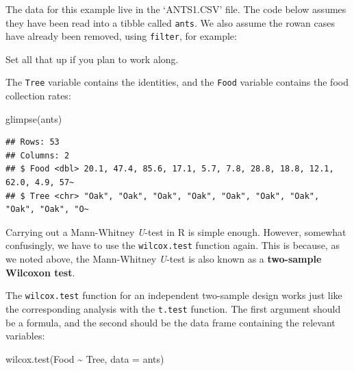\documentclass[
]{book}
\newenvironment{Shaded}{\begin{snugshade}}{\end{snugshade}}
\newcommand{\AttributeTok}[1]{\textcolor[rgb]{0.77,0.63,0.00}{#1}}
\newcommand{\FunctionTok}[1]{\textcolor[rgb]{0.00,0.00,0.00}{#1}}
\newcommand{\NormalTok}[1]{#1}
\newcommand{\SpecialCharTok}[1]{\textcolor[rgb]{0.00,0.00,0.00}{#1}}
\newenvironment{greybox}{
  \definecolor{shadecolor}{rgb}{0.95,0.95,0.95}  %
  \color{black}
  \begin{shaded}}
 {\end{shaded}}
\newenvironment{infobox}[1]
  {
  \begin{itemize}
  \renewcommand{\labelitemi}{
    \raisebox{-.7\height}[0pt][0pt]{
      {\setkeys{Gin}{width=3em,keepaspectratio}
        \texttt{[image: images/\#1]}}
    }
  }
  \setlength{\fboxsep}{1em}
  \begin{greybox}
  \item
  }
  {
  \end{greybox}
  \end{itemize}
  }
\begin{document}
\begin{infobox}{action}

\hypertarget{section-20}{%
\subsubsection*{}\label{section-20}}

The data for this example live in the `ANTS1.CSV' file. The code below assumes they have been read into a tibble called \texttt{ants}. We also assume the rowan cases have already been removed, using \texttt{filter}, for example:

Set all that up if you plan to work along.

\end{infobox}

The \texttt{Tree} variable contains the identities, and the \texttt{Food} variable contains the food collection rates:

\begin{Shaded}
\begin{Highlighting}[]
\FunctionTok{glimpse}\NormalTok{(ants)}
\end{Highlighting}
\end{Shaded}

\begin{verbatim}
## Rows: 53
## Columns: 2
## $ Food <dbl> 20.1, 47.4, 85.6, 17.1, 5.7, 7.8, 28.8, 18.8, 12.1, 62.0, 4.9, 57~
## $ Tree <chr> "Oak", "Oak", "Oak", "Oak", "Oak", "Oak", "Oak", "Oak", "Oak", "O~
\end{verbatim}

Carrying out a Mann-Whitney \emph{U}-test in R is simple enough. However, somewhat confusingly, we have to use the \texttt{wilcox.test} function again. This is because, as we noted above, the Mann-Whitney \emph{U}-test is also known as a \textbf{two-sample Wilcoxon test}.

The \texttt{wilcox.test} function for an independent two-sample design works just like the corresponding analysis with the \texttt{t.test} function. The first argument should be a formula, and the second should be the data frame containing the relevant variables:

\begin{Shaded}
\begin{Highlighting}[]
\FunctionTok{wilcox.test}\NormalTok{(Food }\SpecialCharTok{\textasciitilde{}}\NormalTok{ Tree, }\AttributeTok{data =}\NormalTok{ ants)}
\end{Highlighting}
\end{Shaded}
\end{document}
